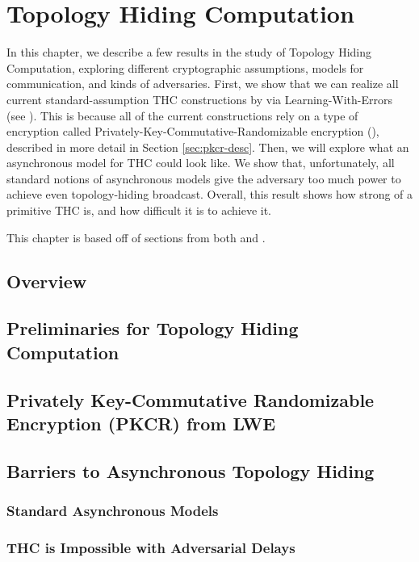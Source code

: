 \chapter{Topology Hiding Computation}\label{chap:THC}
In this chapter, we describe a few results in the study of Topology Hiding Computation, exploring different cryptographic assumptions, models for communication, and kinds of adversaries.
First, we show that we can realize all current standard-assumption THC constructions by via Learning-With-Errors (see \cite{C:Regev06}). This is because all of the current constructions rely on a type of encryption called Privately-Key-Commutative-Randomizable encryption (\PKCR), described in more detail in Section \ref{sec:pkcr-desc}.
Then, we will explore what an asynchronous model for THC could look like. We show that, unfortunately, all standard notions of asynchronous models give the adversary too much power to achieve even topology-hiding broadcast.
Overall, this result shows how strong of a primitive THC is, and how difficult it is to achieve it.

This chapter is based off of sections from both \cite{LLMMMT18} and \cite{LLMMMT20}.

\section{Overview}


\section{Preliminaries for Topology Hiding Computation}\label{sec:thc-prelim}


\section{Privately Key-Commutative Randomizable Encryption (PKCR) from LWE}
\label{sec:lwe-pkcr}

\section{Barriers to Asynchronous Topology Hiding}\label{sec:impossible}

\subsection{Standard Asynchronous Models}

\subsection{THC is Impossible with Adversarial Delays}




